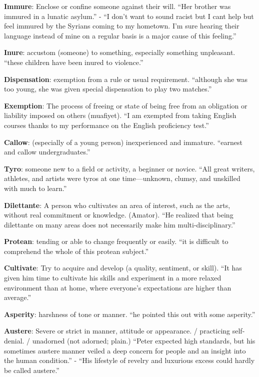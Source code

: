 \documentclass[12pt, a4paper]{ximera}
\begin{document}
\textbf{Immure}: Enclose or confine someone against their will. ``Her brother was immured in a lunatic asylum.'' - ``I don't want to sound racist but I cant help but feel immured by the Syrians coming to my hometown. I'm sure hearing their language instead of mine on a regular basis is a major cause of this feeling.''

\textbf{Inure}: accustom (someone) to something, especially something unpleasant. ``these children have been inured to violence.''

\textbf{Dispensation}: exemption from a rule or usual requirement. ``although she was too young, she was given special dispensation to play two matches.''

\textbf{Exemption}: The process of freeing or state of being free from an obligation or liability imposed on others (muafiyet). ``I am exempted from taking English courses thanks to my performance on the English proficiency test.''

\textbf{Callow}: (especially of a young person) inexperienced and immature. ``earnest and callow undergraduates.''

\textbf{Tyro}: someone new to a field or activity, a beginner or novice. ``All great writers, athletes, and artists were tyros at one time—unknown, clumsy, and unskilled with much to learn.''

\textbf{Dilettante}: A person who cultivates an area of interest, such as the arts, without real commitment or knowledge. (Amator). ``He realized that being dilettante on many areas does not necessarily make him multi-disciplinary.''

\textbf{Protean}: tending or able to change frequently or easily. ``it is difficult to comprehend the whole of this protean subject.''

\textbf{Cultivate}: Try to acquire and develop (a quality, sentiment, or skill). ``It has given him time to cultivate his skills and experiment in a more relaxed environment than at home, where everyone's expectations are higher than average.''

\textbf{Asperity}: harshness of tone or manner. ``he pointed this out with some asperity.''

\textbf{Austere}: Severe or strict in manner, attitude or appearance. / practicing self-denial. / unadorned (not adorned; plain.) ``Peter expected high standards, but his sometimes austere manner veiled a deep concern for people and an insight into the human condition.'' - ``His lifestyle of revelry and luxurious excess could hardly be called austere.''
\end{document}
